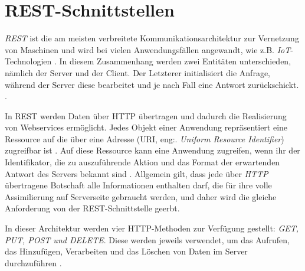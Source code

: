 \section{REST-Schnittstellen}
\textit{REST} ist die am meisten verbreitete Kommunikationsarchitektur zur Vernetzung von Maschinen und wird bei vielen Anwendungsfällen angewandt, wie z.B. \textit{IoT}-Technologien \cite{reinheimerIndustrieHerausforderungenKonzepte2017}. In diesem Zusammenhang werden zwei Entitäten unterschieden, nämlich der Server und der Client. Der Letzterer initialisiert die Anfrage, während der Server diese bearbeitet und je nach Fall eine Antwort zurückschickt. \cite{balzertLehrbuchSoftwaretechnikEntwurf2011}.

In REST werden Daten über HTTP übertragen und dadurch die Realisierung von Webservices ermöglicht. Jedes Objekt einer Anwendung repräsentiert eine Ressource auf die über eine Adresse (URI, eng:. \textit{Uniform Resource Identifier}) zugreifbar ist \cite{balzertLehrbuchSoftwaretechnikEntwurf2011}. Auf diese Ressource kann eine Anwendung zugreifen, wenn ihr der Identifikator, die zu auszuführende Aktion und das Format der erwartenden Antwort des Servers bekannt sind \cite{balzertLehrbuchSoftwaretechnikEntwurf2011}. Allgemein gilt, dass jede über \textit{HTTP} übertragene Botschaft alle Informationen enthalten darf, die für ihre volle Assimilierung auf Serverseite gebraucht werden, und daher wird die gleiche Anforderung von der REST-Schnittstelle geerbt.

In dieser Architektur werden vier HTTP-Methoden zur Verfügung gestellt: \textit{GET, PUT, POST und DELETE}. Diese werden jeweils verwendet, um das Aufrufen, das Hinzufügen, Verarbeiten und das Löschen von Daten im Server durchzuführen \cite{balzertLehrbuchSoftwaretechnikEntwurf2011}.


